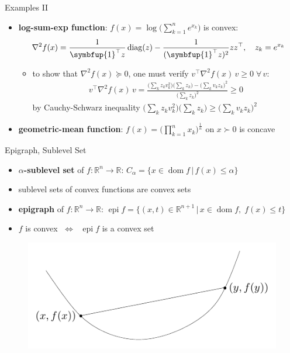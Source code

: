 \documentclass[10pt]{beamer}
\newcommand{\ds}{\displaystyle}
\newcommand{\ifff}{\;\Longleftrightarrow\;}
\DeclareMathOperator*{\dom}{dom}
\DeclareMathOperator*{\diag}{diag}
\DeclareMathOperator*{\epi}{epi}
\theoremstyle{definition}
\begin{document}
\begin{frame}{Examples II}
  \begin{itemize}
    \item {\bf log-sum-exp function}: $\ds f(x) = \log\Big(\sum_{k = 1}^n e^{x_k}\Big)$ is convex:
      \begin{align*}
        \nabla^2 f(x) = \frac{1}{\symbfup{1}^\top z}\diag(z) - \frac{1}{(\symbfup{1}^\top z)^2}zz^\top, \quad z_k = e^{x_k}
      \end{align*}
      \begin{itemize}
        \item to show that $\nabla^2 f(x)\succcurlyeq 0$, one must verify $\ds v^\top\nabla^2 f(x)\,v\geqslant 0\;\forall\,v$:
          \begin{align*}  
            v^\top\nabla^2 f(x)\,v = \frac{\big(\sum_k z_k v_k^2\big)\big(\sum_k z_k\big) - \big(\sum_k v_k z_k\big)^2}{\big(\sum_k z_k\big)^2}\geqslant 0
          \end{align*}
          by Cauchy-Schwarz inequality $\ds \Big(\sum_k z_k v_k^2\Big)\Big(\sum_k z_k\Big) \geqslant \Big(\sum_k v_k z_k\Big)^2$
      \end{itemize}
    \item {\bf geometric-mean function}: $\ds f(x) = \Big(\prod_{k = 1}^n x_k\Big)^{\frac{1}{n}}$ on $x\succ 0$ is concave
  \end{itemize}
\end{frame}

\begin{frame}{Epigraph, Sublevel Set}
  \begin{itemize}
    \item {\bf $\alpha$-sublevel set} of $f:\mathbb{R}^n\to\mathbb{R}$: $\ds C_\alpha = \{x\in\dom f\,|\, f(x)\leqslant\alpha\}$
    \item sublevel sets of convex functions are convex sets
    \item {\bf epigraph} of $f: \mathbb{R}^n\to\mathbb{R}$: $\ds\epi f = \{(x, t)\in\mathbb{R}^{n+1}\,|\,x\in\dom f,\; f(x)\leqslant t\}$
    \item $f$ is convex $\ifff$ $\ds\epi f$ is a convex set
  \end{itemize}
  \begin{figure}[!htbp]
    \centering
    \includegraphics[scale=0.8,page=5]{fig/note06/03.pdf}
  \end{figure}
\end{frame}
\end{document}
